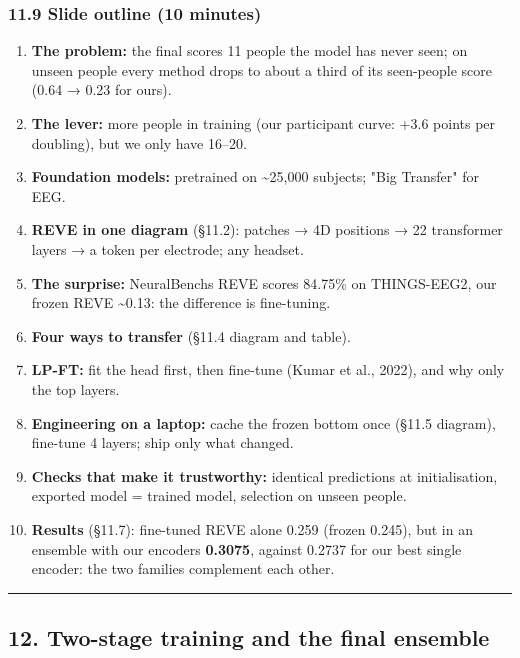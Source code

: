 \documentclass[
  11pt,
]{article}
\providecommand{\tightlist}{%
  \setlength{\itemsep}{0pt}\setlength{\parskip}{0pt}}
\renewcommand{\_}{\oldunderscore\allowbreak}
\begin{document}
\subsubsection{11.9 Slide outline (10
minutes)}\label{slide-outline-10-minutes}

\begin{enumerate}
\def\labelenumi{\arabic{enumi}.}
\tightlist
\item
  \textbf{The problem:} the final scores
  11 people the model has never seen; on
  unseen people every method drops to
  about a third of its seen-people score
  (0.64 → 0.23 for ours).
\item
  \textbf{The lever:} more people in
  training (our participant curve: +3.6
  points per doubling), but we only have
  16--20.
\item
  \textbf{Foundation models:} pretrained
  on \textasciitilde25,000 subjects;
  "Big Transfer" for EEG.
\item
  \textbf{REVE in one diagram} (§11.2):
  patches → 4D positions → 22
  transformer layers → a token per
  electrode; any headset.
\item
  \textbf{The surprise:}
  NeuralBench\textquotesingle s REVE
  scores 84.75\% on THINGS-EEG2, our
  frozen REVE \textasciitilde0.13: the
  difference is fine-tuning.
\item
  \textbf{Four ways to transfer} (§11.4
  diagram and table).
\item
  \textbf{LP-FT:} fit the head first,
  then fine-tune (Kumar et al., 2022),
  and why only the top layers.
\item
  \textbf{Engineering on a laptop:}
  cache the frozen bottom once (§11.5
  diagram), fine-tune 4 layers; ship
  only what changed.
\item
  \textbf{Checks that make it
  trustworthy:} identical predictions at
  initialisation, exported model =
  trained model, selection on unseen
  people.
\item
  \textbf{Results} (§11.7): fine-tuned
  REVE alone 0.259 (frozen 0.245), but
  in an ensemble with our encoders
  \textbf{0.3075}, against 0.2737 for
  our best single encoder: the two
  families complement each other.
\end{enumerate}

\begin{center}\rule{0.5\linewidth}{0.5pt}\end{center}

\subsection{12. Two-stage training and
the final
ensemble}\label{two-stage-training-and-the-final-ensemble}
\end{document}
